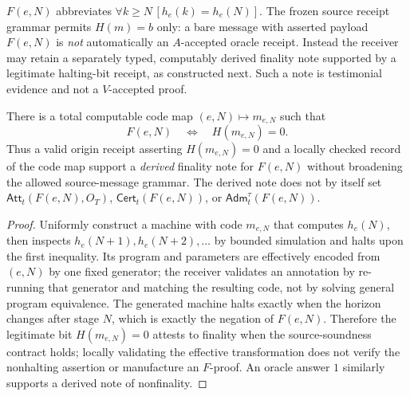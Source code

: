 \documentclass[11pt,letterpaper]{article}
\newcommand{\Cert}{\mathsf{Cert}}\newcommand{\Att}{\mathsf{Att}}\newcommand{\Relay}{\mathsf{Relay}}\newcommand{\Auth}{\mathsf{Auth}}\newcommand{\Trust}{\mathsf{Trusted}}\newcommand{\Adm}{\mathsf{Adm}}\newcommand{\Proof}{\mathsf{Proof}}\newcommand{\Msg}{\mathsf{Msg}}\newcommand{\Log}{\mathcal L}\newcommand{\N}{\mathbb N}
\begin{document}
\begin{definition}
$F(e,N)$ abbreviates $\forall k\ge N\,[h_e(k)=h_e(N)]$. The frozen source receipt grammar permits $H(m)=b$ only: a bare message with asserted payload $F(e,N)$ is \emph{not} automatically an $A$-accepted oracle receipt. Instead the receiver may retain a separately typed, computably derived finality note supported by a legitimate halting-bit receipt, as constructed next. Such a note is testimonial evidence and not a $V$-accepted proof.
\end{definition}
\begin{lemma}
There is a total computable code map $(e,N)\mapsto m_{e,N}$ such that
\[
F(e,N)\quad\Longleftrightarrow\quad H(m_{e,N})=0.
\]
Thus a valid origin receipt asserting $H(m_{e,N})=0$ and a locally checked record of the code map support a \emph{derived} finality note for $F(e,N)$ without broadening the allowed source-message grammar. The derived note does not by itself set $\Att_t(F(e,N),O_T)$, $\Cert_t(F(e,N))$, or $\Adm_t^\tau(F(e,N))$.
\end{lemma}
\begin{proof}
Uniformly construct a machine with code $m_{e,N}$ that computes $h_e(N)$, then inspects $h_e(N+1),h_e(N+2),\dots$ by bounded simulation and halts upon the first inequality. Its program and parameters are effectively encoded from $(e,N)$ by one fixed generator; the receiver validates an annotation by re-running that generator and matching the resulting code, not by solving general program equivalence. The generated machine halts exactly when the horizon changes after stage $N$, which is exactly the negation of $F(e,N)$. Therefore the legitimate bit $H(m_{e,N})=0$ attests to finality when the source-soundness contract holds; locally validating the effective transformation does not verify the nonhalting assertion or manufacture an $F$-proof. An oracle answer $1$ similarly supports a derived note of nonfinality.
\end{proof}
\end{document}
